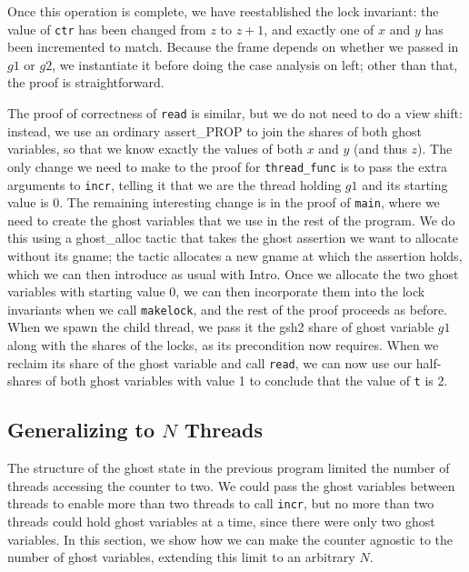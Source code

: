 \documentclass[11pt]{article}
\begin{document}
Once this operation is complete, we have reestablished the lock invariant: the value of \texttt{ctr} has been changed from $z$ to $z + 1$, and exactly one of $x$ and $y$ has been incremented to match. Because the frame depends on whether we passed in $g1$ or $g2$, we instantiate it before doing the case analysis on \textsf{left}; other than that, the proof is straightforward.

The proof of correctness of \texttt{read} is similar, but we do not need to do a view shift: instead, we use an ordinary \textsf{assert\_PROP} to join the shares of both ghost variables, so that we know exactly the values of both $x$ and $y$ (and thus $z$). The only change we need to make to the proof for \texttt{thread\_func} is to pass the extra arguments to \texttt{incr}, telling it that we are the thread holding $g1$ and its starting value is 0. The remaining interesting change is in the proof of \texttt{main}, where we need to create the ghost variables that we use in the rest of the program. We do this using a \textsf{ghost\_alloc} tactic that takes the ghost assertion we want to allocate without its \textsf{gname}; the tactic allocates a new \textsf{gname} at which the assertion holds, which we can then introduce as usual with \textsf{Intro}. Once we allocate the two ghost variables with starting value 0, we can then incorporate them into the lock invariants when we call \texttt{makelock}, and the rest of the proof proceeds as before. When we spawn the child thread, we pass it the \textsf{gsh2} share of ghost variable $g1$ along with the shares of the locks, as its precondition now requires. When we reclaim its share of the ghost variable and call \texttt{read}, we can now use our half-shares of both ghost variables with value 1 to conclude that the value of \texttt{t} is 2.

\subsection{Generalizing to $N$ Threads}
\label{incrN}

The structure of the ghost state in the previous program limited the number of threads accessing the counter to two. We could pass the ghost variables between threads to enable more than two threads to call \texttt{incr}, but no more than two threads could hold ghost variables at a time, since there were only two ghost variables. In this section, we show how we can make the counter agnostic to the number of ghost variables, extending this limit to an arbitrary $N$.
\end{document}
